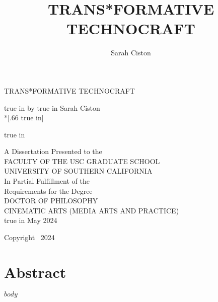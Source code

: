 \documentclass[11pt,oneside]{scrbook} %
\title{TRANS*FORMATIVE TECHNOCRAFT}
\author{Sarah Ciston}
\begin{document}
{}%
\pagestyle{empty}%
\begin{singlespace}%
    \hypersetup{hidelinks}

  \large  %
    \setcounter{page}{0}%
    \null
    \vfill%
    \begin{center} 
    \begin{doublespace}
        TRANS*FORMATIVE TECHNOCRAFT \par
       true in
      by%
       true in
      Sarah Ciston\\*[.66 true in]%
      \par
       true in
    \end{doublespace}
      A Dissertation Presented to the\\%
      FACULTY OF THE USC GRADUATE SCHOOL\\%
      UNIVERSITY OF SOUTHERN CALIFORNIA\\%
      In Partial Fulfillment of the\\%
      Requirements for the Degree\\%
      DOCTOR OF PHILOSOPHY\\%
      CINEMATIC ARTS (MEDIA ARTS AND PRACTICE)\\%
       true in
      May 2024%
    \end{center}%
    \par
    \vfill
          \noindent Copyright~ 2024 \hfill \@author
    \end{singlespace}
\newpage
\renewcommand{\contentsname}{Table of Contents}
        \tableofcontents
        \listoffigures
    \newpage
    \pagestyle{plain}%
    \setcounter{page}{1}

\chapter*{Abstract}

\newpage

$body$
\end{document}
